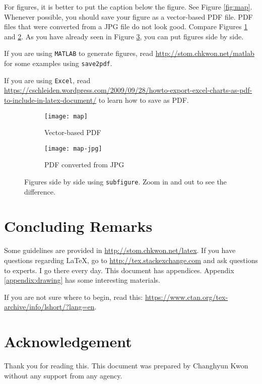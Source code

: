 \documentclass[letterpaper, 11pt]{article}
\begin{document}
For figures, it is better to put the caption below the figure.
See Figure \ref{fig:map}.
Whenever possible, you should save your figure as a vector-based PDF file.
PDF files that were converted from a JPG file do not look good.
Compare Figures \ref{fig:map-pdf} and \ref{fig:map-jpg}.
As you have already seen in Figure \ref{fig:side-by-side}, you can put figures side by side.

If you are using \texttt{MATLAB} to generate figures, read \url{http://stom.chkwon.net/matlab} for some examples using \texttt{save2pdf}.

If you are using \texttt{Excel}, read \url{https://cschleiden.wordpress.com/2009/09/28/howto-export-excel-charts-as-pdf-to-include-in-latex-document/} to learn how to save as PDF.



\begin{figure} \centering
\begin{subfigure}[b]{0.4\textwidth}
\texttt{[image: map]}
\caption{Vector-based PDF}
\label{fig:map-pdf}
\end{subfigure}
%
\begin{subfigure}[b]{0.4\textwidth}
\texttt{[image: map-jpg]}
\caption{PDF converted from JPG}
\label{fig:map-jpg}
\end{subfigure}
\caption{Figures side by side using \texttt{subfigure}. Zoom in and out to see the difference.}
\label{fig:side-by-side}
\end{figure}











\section{Concluding Remarks}

Some guidelines are provided in \url{http://stom.chkwon.net/latex}.
If you have questions regarding \LaTeX, go to \url{http://tex.stackexchange.com} and ask questions to experts.
I go there every day.
This document has appendices.
Appendix \ref{appendix:drawing} has some interesting materials.

If you are not sure where to begin, read this: \url{https://www.ctan.org/tex-archive/info/lshort/?lang=en}.


\section*{Acknowledgement}
Thank you for reading this.
This document was prepared by Changhyun Kwon without any support from any agency.
\end{document}
